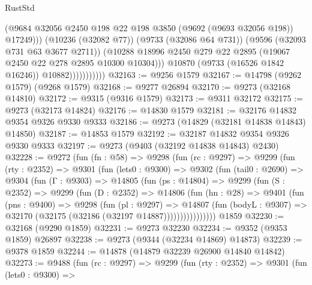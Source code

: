\begin{lexlean}{RustStd}
\begin{coremodule}
                                (@9684
                                  @32056
                                  @2450
                                  @198
                                  @22
                                  @198
                                  @3850
                                  (@9692 (@9693 @32056 @198))
                                  @17249)))
                            (@10236 (@32082 @77))
                            (@9733 (@32086 @64 @731))
                            (@9596 (@32093 @731 @63 @3677 @2711))
                            (@10288
                              @18996
                              @2450
                              @279
                              @22
                              @2895
                              (@19067 @2450 @22 @278 @2895 @10300 @10304)))
                          @10870
                          (@9733 (@16526 @1842 @16246))
                          @10882)))))))))))
@32163 := @9256 @1579
@32167 := @14798 (@9262 @1579) (@9268 @1579)
@32168 := @9277 @26894
@32170 := @9273 (@32168 @14810)
@32172 := @9315 (@9316 @1579)
@32173 := @9311 @32172
@32175 := @9273 (@32173 @14824)
@32176 := @14830 @1579
@32181 := @32176 @14832 @9354 @9326 @9330 @9333
@32186 := @9273 (@14829 (@32181 @14838 @14843) @14850)
@32187 := @14853 @1579
@32192 := @32187 @14832 @9354 @9326 @9330 @9333
@32197 := @9273 (@9403 (@32192 @14838 @14843) @2430)
@32228 := @9272
    (fun (fn : @58) =>
    @9298
      (fun (rc : @9297) =>
      @9299
        (fun (rty : @2352) =>
        @9301
          (fun (lets0 : @9300) =>
          @9302
            (fun (tail0 : @2690) =>
            @9304
              (fun (Γ : @9303) =>
              @14805
                (fun (ps : @14804) =>
                @9299
                  (fun (S : @2352) =>
                  @9299
                    (fun (D : @2352) =>
                    @14806
                      (fun (hn : @28) =>
                      @9401
                        (fun (pns : @9400) =>
                        @9298
                          (fun (pl : @9297) =>
                          @14807
                            (fun (bodyL : @9307) =>
                            @32170 (@32175 (@32186 (@32197 @14887))))))))))))))))
    @1859
@32230 := @32168 (@9290 @1859)
@32231 := @9273 @32230
@32234 := @9352 (@9353 @1859) @26897
@32238 := @9273 (@9344 (@32234 @14869) @14873)
@32239 := @9378 @1859
@32244 := @14878 (@14879 @32239 @26900 @14840 @14842)
@32273 := @9488
    (fun (rc : @9297) =>
    @9299
      (fun (rty : @2352) =>
      @9301
        (fun (lets0 : @9300) =>

\end{coremodule}
\end{lexlean}
